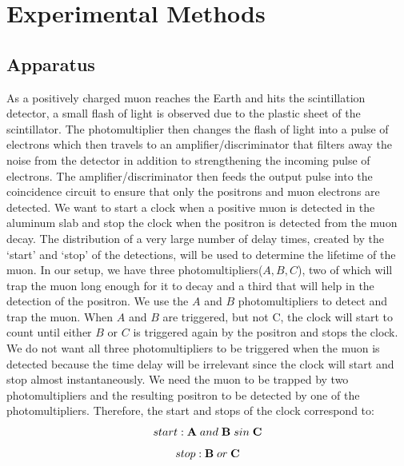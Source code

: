 \section{Experimental Methods}
\subsection{Apparatus}
\indent  \indent As a positively charged muon reaches the Earth and hits the scintillation detector, a small flash of light is observed due to the plastic sheet of the scintillator. The photomultiplier then changes the flash of light into a pulse of electrons which then travels to an amplifier/discriminator that filters away the noise from the detector in addition to strengthening the incoming pulse of electrons. The amplifier/discriminator then feeds the output pulse into the coincidence circuit to ensure that only the positrons and muon electrons are detected. 
\newline \indent We want to start a clock when a positive muon is detected in the aluminum slab and stop the clock when the positron is detected from the muon decay. The distribution of a very large number of delay times, created by the `start' and `stop' of the detections, will be used to determine the lifetime of the muon. 
\newline \indent In our setup, we have three photomultipliers($A, B, C$), two of which will trap the muon long enough for it to decay and a third that will help in the detection of the positron. We use the $A$ and $B$ photomultipliers to detect and trap the muon. When $A$ and $B$ are triggered, but not C, the clock will start to count until either $B$ or $C$ is triggered again by the positron and stops the clock. We do not want all three photomultipliers to be triggered when the muon is detected because the time delay will be irrelevant since the clock will start and stop almost instantaneously. We need the muon to be trapped by two photomultipliers and the resulting positron to be detected by one of the photomultipliers. Therefore, the start and stops of the clock correspond to:
\begin{equation} start: \textbf A\;and\; \textbf B \;sin\; \textbf C \end{equation}
\begin{equation} stop: \textbf B\; or\; \textbf C \end{equation}
